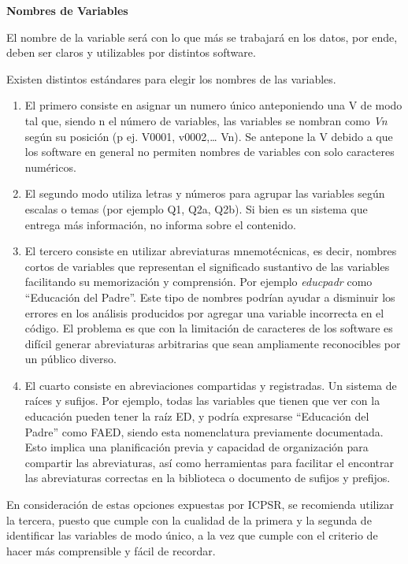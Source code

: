 \documentclass[
  spanish,
  letterpaper,
  DIV=11,
  numbers=noendperiod]{scrreprt}
\begin{document}
\textbf{Nombres de Variables}

El nombre de la variable será con lo que más se trabajará en los datos,
por ende, deben ser claros y utilizables por distintos software.

Existen distintos estándares para elegir los nombres de las variables.

\begin{enumerate}
\def\labelenumi{\arabic{enumi}.}
\item
  El primero consiste en asignar un numero único anteponiendo una V de
  modo tal que, siendo n el número de variables, las variables se
  nombran como \emph{Vn} según su posición (p ej. V0001, v0002,\ldots{}
  Vn). Se antepone la V debido a que los software en general no permiten
  nombres de variables con solo caracteres numéricos.
\item
  El segundo modo utiliza letras y números para agrupar las variables
  según escalas o temas (por ejemplo Q1, Q2a, Q2b). Si bien es un
  sistema que entrega más información, no informa sobre el contenido.
\item
  El tercero consiste en utilizar abreviaturas mnemotécnicas, es decir,
  nombres cortos de variables que representan el significado sustantivo
  de las variables facilitando su memorización y comprensión. Por
  ejemplo \emph{educpadr} como ``Educación del Padre''. Este tipo de
  nombres podrían ayudar a disminuir los errores en los análisis
  producidos por agregar una variable incorrecta en el código. El
  problema es que con la limitación de caracteres de los software es
  difícil generar abreviaturas arbitrarias que sean ampliamente
  reconocibles por un público diverso.
\item
  El cuarto consiste en abreviaciones compartidas y registradas. Un
  sistema de raíces y sufijos. Por ejemplo, todas las variables que
  tienen que ver con la educación pueden tener la raíz ED, y podría
  expresarse ``Educación del Padre'' como FAED, siendo esta nomenclatura
  previamente documentada. Esto implica una planificación previa y
  capacidad de organización para compartir las abreviaturas, así como
  herramientas para facilitar el encontrar las abreviaturas correctas en
  la biblioteca o documento de sufijos y prefijos.
\end{enumerate}

En consideración de estas opciones expuestas por ICPSR, se recomienda
utilizar la tercera, puesto que cumple con la cualidad de la primera y
la segunda de identificar las variables de modo único, a la vez que
cumple con el criterio de hacer más comprensible y fácil de recordar.
\end{document}
